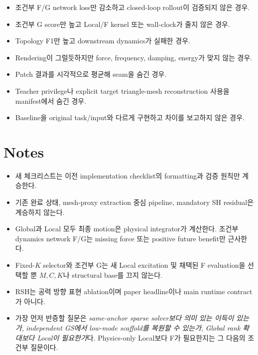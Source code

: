 \documentclass[10pt,a4paper]{article}
\begin{document}
\begin{itemize}
  \item 조건부 F/G network loss만 감소하고 closed-loop rollout이 검증되지 않은 경우.
  \item 조건부 G score만 높고 Local/F kernel 또는 wall-clock가 줄지 않은 경우.
  \item Topology F1만 높고 downstream dynamics가 실패한 경우.
  \item Rendering이 그럴듯하지만 force, frequency, damping, energy가 맞지 않는 경우.
  \item Patch 결과를 시각적으로 평균해 seam을 숨긴 경우.
  \item Teacher privilege나 explicit target triangle-mesh reconstruction 사용을 manifest에서 숨긴 경우.
  \item Baseline을 original task/input와 다르게 구현하고 차이를 보고하지 않은 경우.
\end{itemize}

\section*{Notes}

\begin{itemize}
  \item 새 체크리스트는 이전 implementation checklist의 formatting과 검증 원칙만 계승한다.
  \item 기존 완료 상태, mesh-proxy extraction 중심 pipeline, mandatory SH residual은 계승하지 않는다.
  \item Global과 Local 모두 최종 motion은 physical integrator가 계산한다. 조건부 dynamics network F/G는 missing force 또는 positive future benefit만 근사한다.
  \item Fixed-\(K\) selector와 조건부 G는 새 Local excitation 및 채택된 F evaluation을 선택할 뿐 \(M,C,K\)나 structural base를 끄지 않는다.
  \item RSH는 공력 방향 표현 ablation이며 paper headline이나 main runtime contract가 아니다.
  \item 가장 먼저 반증할 질문은 \emph{same-anchor sparse solver보다 의미 있는 이득이 있는가},
  \emph{independent GS에서 low-mode scaffold를 복원할 수 있는가},
  \emph{Global rank 확대보다 Local이 필요한가}다.
  Physics-only Local보다 F가 필요한지는 그 다음의 조건부 질문이다.
\end{itemize}
\end{document}
